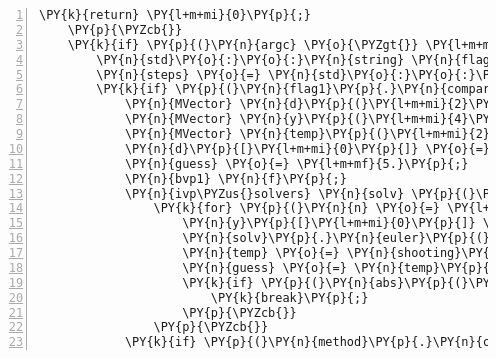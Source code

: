\begin{Verbatim}[tabsize=2,commandchars=\\\{\},numbers=left,firstnumber=1,stepnumber=1]
		\PY{k}{return} \PY{l+m+mi}{0}\PY{p}{;}
	\PY{p}{\PYZcb{}}
	\PY{k}{if} \PY{p}{(}\PY{n}{argc} \PY{o}{\PYZgt{}} \PY{l+m+mi}{3}\PY{p}{)}\PY{p}{\PYZob{}} \PY{c+c1}{// so long as we have more than 2 arguments we are good to go}
		\PY{n}{std}\PY{o}{:}\PY{o}{:}\PY{n}{string} \PY{n}{flag1} \PY{o}{=} \PY{n}{argv}\PY{p}{[}\PY{l+m+mi}{1}\PY{p}{]}\PY{p}{;}
		\PY{n}{steps} \PY{o}{=} \PY{n}{std}\PY{o}{:}\PY{o}{:}\PY{n}{stoi}\PY{p}{(}\PY{n}{argv}\PY{p}{[}\PY{l+m+mi}{3}\PY{p}{]}\PY{p}{)}\PY{p}{;} \PY{c+c1}{// c++11 way to change a string to an int}
		\PY{k}{if} \PY{p}{(}\PY{n}{flag1}\PY{p}{.}\PY{n}{compare}\PY{p}{(}\PY{l+s}{\PYZdq{}}\PY{l+s}{\PYZhy{}b1}\PY{l+s}{\PYZdq{}}\PY{p}{)} \PY{o}{=}\PY{o}{=} \PY{l+m+mi}{0}\PY{p}{)}\PY{p}{\PYZob{}}
			\PY{n}{MVector} \PY{n}{d}\PY{p}{(}\PY{l+m+mi}{2}\PY{p}{)}\PY{p}{;} \PY{c+c1}{// set the boundary conditions}
			\PY{n}{MVector} \PY{n}{y}\PY{p}{(}\PY{l+m+mi}{4}\PY{p}{)}\PY{p}{;} \PY{c+c1}{// to contain the problem}
			\PY{n}{MVector} \PY{n}{temp}\PY{p}{(}\PY{l+m+mi}{2}\PY{p}{)}\PY{p}{;} \PY{c+c1}{// keep the output from shooting}
			\PY{n}{d}\PY{p}{[}\PY{l+m+mi}{0}\PY{p}{]} \PY{o}{=} \PY{l+m+mi}{0}\PY{p}{;} \PY{n}{d}\PY{p}{[}\PY{l+m+mi}{1}\PY{p}{]} \PY{o}{=} \PY{l+m+mi}{1}\PY{p}{;}
			\PY{n}{guess} \PY{o}{=} \PY{l+m+mf}{5.}\PY{p}{;}
			\PY{n}{bvp1} \PY{n}{f}\PY{p}{;}
			\PY{n}{ivp\PYZus{}solvers} \PY{n}{solv} \PY{p}{(}\PY{n}{steps}\PY{p}{,} \PY{l+m+mi}{0}\PY{p}{,} \PY{l+m+mi}{1}\PY{p}{)}\PY{p}{;}
				\PY{k}{for} \PY{p}{(}\PY{n}{n} \PY{o}{=} \PY{l+m+mi}{0}\PY{p}{;} \PY{n}{n} \PY{o}{\PYZlt{}} \PY{l+m+mi}{500}\PY{p}{;} \PY{n}{n}\PY{o}{+}\PY{o}{+}\PY{p}{)}\PY{p}{\PYZob{}}
					\PY{n}{y}\PY{p}{[}\PY{l+m+mi}{0}\PY{p}{]} \PY{o}{=} \PY{l+m+mf}{0.}\PY{p}{;} \PY{n}{y}\PY{p}{[}\PY{l+m+mi}{1}\PY{p}{]} \PY{o}{=} \PY{n}{guess}\PY{p}{;} \PY{n}{y}\PY{p}{[}\PY{l+m+mi}{2}\PY{p}{]} \PY{o}{=} \PY{l+m+mf}{0.}\PY{p}{;} \PY{n}{y}\PY{p}{[}\PY{l+m+mi}{3}\PY{p}{]} \PY{o}{=} \PY{l+m+mf}{1.}\PY{p}{;}
					\PY{n}{solv}\PY{p}{.}\PY{n}{euler}\PY{p}{(}\PY{n}{y}\PY{p}{,} \PY{n}{f}\PY{p}{,} \PY{n}{j}\PY{p}{)}\PY{p}{;}
					\PY{n}{temp} \PY{o}{=} \PY{n}{shooting}\PY{p}{(}\PY{n}{guess}\PY{p}{,} \PY{n}{y}\PY{p}{,} \PY{n}{d}\PY{p}{)}\PY{p}{;}
					\PY{n}{guess} \PY{o}{=} \PY{n}{temp}\PY{p}{[}\PY{l+m+mi}{0}\PY{p}{]}\PY{p}{;}
					\PY{k}{if} \PY{p}{(}\PY{n}{abs}\PY{p}{(}\PY{n}{temp}\PY{p}{[}\PY{l+m+mi}{1}\PY{p}{]}\PY{p}{)}\PY{o}{\PYZlt{}}\PY{n}{tol}\PY{p}{)}\PY{p}{\PYZob{}} \PY{c+c1}{// finish the loop when sufficently close}
						\PY{k}{break}\PY{p}{;}
					\PY{p}{\PYZcb{}}
				\PY{p}{\PYZcb{}}
			\PY{k}{if} \PY{p}{(}\PY{n}{method}\PY{p}{.}\PY{n}{compare}\PY{p}{(}\PY{l+s}{\PYZdq{}}\PY{l+s}{midpoint}\PY{l+s}{\PYZdq{}}\PY{p}{)} \PY{o}{=}\PY{o}{=} \PY{l+m+mi}{0}\PY{p}{)}\PY{p}{\PYZob{}}

\end{Verbatim}
